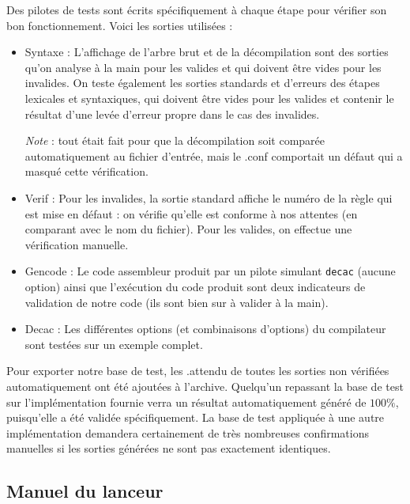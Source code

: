 \documentclass[11pt]{article}
\begin{document}
Des pilotes de tests sont écrits spécifiquement à chaque étape pour vérifier son bon fonctionnement.
Voici les sorties utilisées : 
\begin{itemize}
\item Syntaxe :  L'affichage de l'arbre brut et de la décompilation sont des sorties qu'on analyse à la main pour les valides et qui doivent être vides pour les invalides.
  On teste également les sorties standards et d'erreurs des étapes lexicales et syntaxiques, qui doivent être vides pour les valides et contenir le résultat d'une levée d'erreur propre dans le cas des invalides.
  
\emph{Note} : tout était fait pour que la décompilation soit comparée automatiquement au fichier d'entrée, mais le .conf comportait un défaut qui a masqué cette vérification.
\item Verif : Pour les invalides, la sortie standard affiche le numéro de la règle qui est mise en défaut : on vérifie qu'elle est conforme à nos attentes (en comparant avec le nom du fichier). Pour les valides, on effectue une vérification manuelle.
\item Gencode : Le code assembleur produit par un pilote simulant \verb!decac! (aucune option) ainsi que l'exécution du code produit sont deux indicateurs de validation de notre code (ils sont bien sur à valider à la main).
\item Decac : Les différentes options (et combinaisons d'options) du compilateur sont testées sur un exemple complet.
\end{itemize}
Pour exporter notre base de test, les .attendu de toutes les sorties non vérifiées automatiquement ont été ajoutées à l'archive. Quelqu'un repassant la base de test  sur l'implémentation fournie verra un résultat automatiquement généré de $100\%$, puisqu'elle a été validée spécifiquement. La base de test appliquée à une autre implémentation demandera certainement de très nombreuses confirmations manuelles si les sorties générées ne sont pas exactement identiques.

 \subsection {Manuel du lanceur}

\end{document}
